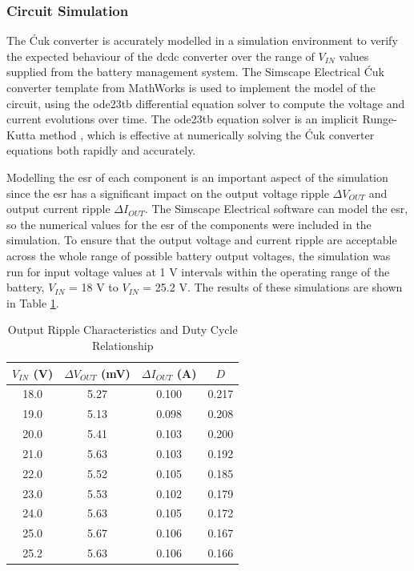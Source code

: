 \subsubsection{Circuit Simulation}

The Ćuk converter is accurately modelled in a simulation environment to verify the expected behaviour of the \acrshort{dcdc} converter over the range of $V_{IN}$ values supplied from the battery management system. The Simscape Electrical Ćuk converter template from MathWorks is used to implement the model of the circuit, using the ode23tb differential equation solver to compute the voltage and current evolutions over time. The ode23tb equation solver is an implicit Runge-Kutta method \cite{matlab_ode23tb}, which is effective at numerically solving the Ćuk converter equations both rapidly and accurately.

Modelling the \gls{esr} of each component is an important aspect of the simulation since the \acrshort{esr} has a significant impact on the output voltage ripple $\Delta V_{OUT}$ and output current ripple $\Delta I_{OUT}$. The Simscape Electrical software can model the \acrshort{esr}, so the numerical values for the \acrshort{esr} of the components were included in the simulation. To ensure that the output voltage and current ripple are acceptable across the whole range of possible battery output voltages, the simulation was run for input voltage values at 1 V intervals within the operating range of the battery, $V_{IN}$ = 18 V to $V_{IN}$ = 25.2 V. The results of these simulations are shown in Table \ref{tab:converter_performance}.

\begin{table}[h]
    \centering
    \renewcommand{\arraystretch}{1.2}
    \begin{tabular}{cccc}
        \toprule
        $V_{IN}$ (V) & $\Delta V_{OUT}$ (mV) & $\Delta I_{OUT}$ (A) & $D$ \\
        \midrule
        18.0 & 5.27 & 0.100 & 0.217 \\
        19.0 & 5.13 & 0.098 & 0.208 \\
        20.0 & 5.41 & 0.103 & 0.200 \\
        21.0 & 5.63 & 0.103 & 0.192 \\
        22.0 & 5.52 & 0.105 & 0.185 \\
        23.0 & 5.53 & 0.102 & 0.179 \\
        24.0 & 5.63 & 0.105 & 0.172 \\
        25.0 & 5.67 & 0.106 & 0.167 \\
        25.2 & 5.63 & 0.106 & 0.166 \\
        \bottomrule
    \end{tabular}
    \caption{Output Ripple Characteristics and Duty Cycle Relationship}
    \label{tab:converter_performance}
\end{table}


